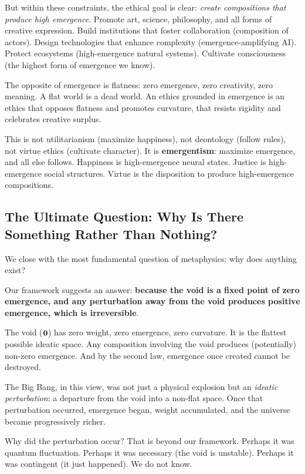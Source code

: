 But within these constraints, the ethical goal is clear: \emph{create
compositions that produce high emergence}. Promote art, science, philosophy,
and all forms of creative expression. Build institutions that foster
collaboration (composition of actors). Design technologies that enhance
complexity (emergence-amplifying AI). Protect ecosystems (high-emergence
natural systems). Cultivate consciousness (the highest form of emergence we
know).

The opposite of emergence is flatness: zero emergence, zero creativity, zero
meaning. A flat world is a dead world. An ethics grounded in emergence is an
ethics that opposes flatness and promotes curvature, that resists rigidity
and celebrates creative surplus.

This is not utilitarianism (maximize happiness), not deontology (follow rules),
not virtue ethics (cultivate character). It is \textbf{emergentism}: maximize
emergence, and all else follows. Happiness is high-emergence neural states.
Justice is high-emergence social structures. Virtue is the disposition to
produce high-emergence compositions.

\subsection{The Ultimate Question: Why Is There Something Rather Than Nothing?}

We close with the most fundamental question of metaphysics: why does anything
exist?

Our framework suggests an answer: \textbf{because the void is a fixed point
of zero emergence, and any perturbation away from the void produces positive
emergence, which is irreversible}.

The void ($\mathbf{0}$) has zero weight, zero emergence, zero curvature. It is the
flattest possible ideatic space. Any composition involving the void produces
(potentially) non-zero emergence. And by the second law, emergence once
created cannot be destroyed.

The Big Bang, in this view, was not just a physical explosion but an
\emph{ideatic perturbation}: a departure from the void into a non-flat space.
Once that perturbation occurred, emergence began, weight accumulated, and the
universe became progressively richer.

Why did the perturbation occur? That is beyond our framework. Perhaps it was
quantum fluctuation. Perhaps it was necessary (the void is unstable). Perhaps
it was contingent (it just happened). We do not know.

